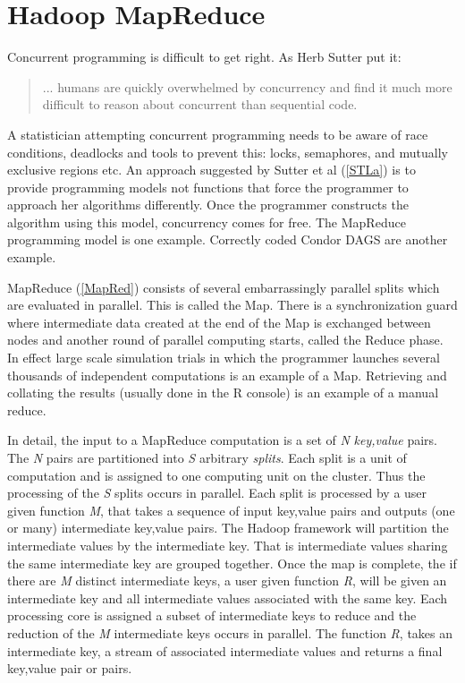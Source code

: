 \documentclass[letterpaper,10pt,english]{sphinxmanual}
\begin{document}
\section{Hadoop MapReduce}
\label{introduction:hadoop-mapreduce}
Concurrent programming is difficult to get right. As Herb Sutter put it:
\begin{quote}

... humans are quickly overwhelmed by concurrency and find it much more difficult to reason about concurrent than sequential code.
\end{quote}

A statistician attempting concurrent programming needs to be aware of race
conditions, deadlocks and tools to prevent this: locks, semaphores, and
mutually exclusive regions etc. An approach suggested by Sutter et al ({\hyperref[introduction:stla]{{[}STLa{]}}}) is to
provide programming models not functions that force
the programmer to approach her algorithms differently. Once the programmer
constructs the algorithm using this model, concurrency comes for free.  The
MapReduce programming model is one example. Correctly coded Condor DAGS are another
example.

MapReduce ({\hyperref[introduction:mapred]{{[}MapRed{]}}}) consists of several embarrassingly parallel splits which are evaluated
in parallel. This is called the Map. There is a synchronization guard where
intermediate data created at the end of the Map is exchanged between nodes and
another round of parallel computing starts, called the Reduce phase. In effect
large scale simulation trials in which the programmer launches several thousands
of independent computations is an example of a Map. Retrieving and collating the
results (usually done in the R console) is an example of a manual reduce.

In detail, the input to a MapReduce computation is a set of \emph{N} \emph{key,value}
pairs. The \emph{N} pairs are partitioned into \emph{S} arbitrary \emph{splits}. Each split is
a unit of computation and is assigned to one computing unit on the cluster. Thus
the processing of the \emph{S} splits occurs in parallel. Each split is processed by
a user given function \emph{M}, that takes a sequence of input key,value pairs and outputs
(one or many) intermediate key,value pairs. The Hadoop framework will partition
the intermediate values by the intermediate key. That is intermediate values
sharing the same intermediate key are grouped together. Once the map is
complete, the if there are \emph{M} distinct intermediate keys, a user given function
\emph{R}, will be given an intermediate key and all intermediate values associated
with the same key. Each processing core is assigned a subset of intermediate
keys to reduce and the reduction of the \emph{M} intermediate keys occurs in
parallel. The function \emph{R}, takes an intermediate key, a stream of associated
intermediate values and returns a final key,value pair or pairs.
\end{document}
